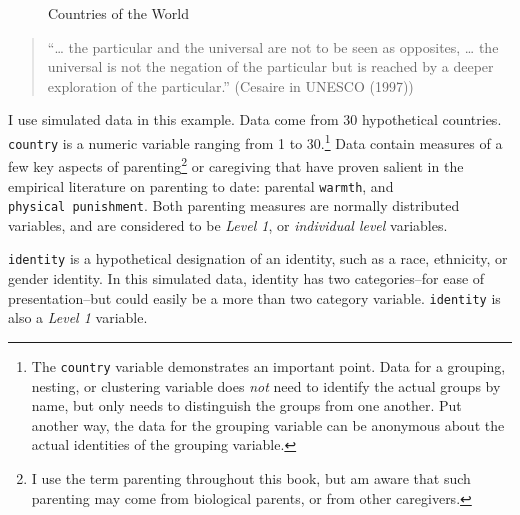 \documentclass[
  letterpaper,
  DIV=11,
  numbers=noendperiod]{scrreprt}
\begin{document}
\begin{figure}


\caption{\label{fig-world}Countries of the World}

\end{figure}%

\begin{quote}
``\ldots{} the particular and the universal are not to be seen as
opposites, \ldots{} the universal is not the negation of the particular
but is reached by a deeper exploration of the particular.'' (Cesaire in
UNESCO (1997)) 
\end{quote}

I use simulated data in this example. Data come from 30 hypothetical
countries. \texttt{country} is a numeric variable ranging from 1 to
30.\footnote{The \texttt{country} variable demonstrates an important
  point. Data for a grouping, nesting, or clustering variable does
  \emph{not} need to identify the actual groups by name, but only needs
  to distinguish the groups from one another. Put another way, the data
  for the grouping variable can be anonymous about the actual identities
  of the grouping variable.} Data contain measures of a few key aspects
of parenting\footnote{I use the term parenting throughout this book, but
  am aware that such parenting may come from biological parents, or from
  other caregivers.} or caregiving that have proven salient in the
empirical literature on parenting to date: parental \texttt{warmth}, and
\texttt{physical\ punishment}. Both parenting measures are normally
distributed variables, and are considered to be \emph{Level 1}, or
\emph{individual level} variables.

\texttt{identity} is a hypothetical designation of an identity, such as
a race, ethnicity, or gender identity. In this simulated data, identity
has two categories--for ease of presentation--but could easily be a more
than two category variable. \texttt{identity} is also a \emph{Level 1}
variable.
\end{document}

